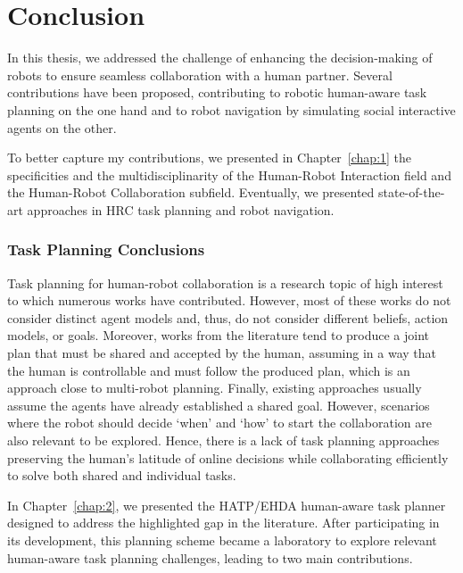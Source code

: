 \chapter*{Conclusion}


In this thesis, we addressed the challenge of enhancing the decision-making of robots to ensure seamless collaboration with a human partner. Several contributions have been proposed, contributing to robotic human-aware task planning on the one hand and to robot navigation by simulating social interactive agents on the other. 

To better capture my contributions, we presented in Chapter~\ref{chap:1} the specificities and the multidisciplinarity of the Human-Robot Interaction field and the Human-Robot Collaboration subfield. Eventually, we presented state-of-the-art approaches in HRC task planning and robot navigation. 

\subsection*{Task Planning Conclusions}

Task planning for human-robot collaboration is a research topic of high interest to which numerous works have contributed. However, most of these works do not consider distinct agent models and, thus, do not consider different beliefs, action models, or goals. Moreover, works from the literature tend to produce a joint plan that must be shared and accepted by the human, assuming in a way that the human is controllable and must follow the produced plan, which is an approach close to multi-robot planning. Finally, existing approaches usually assume the agents have already established a shared goal. However, scenarios where the robot should decide `when' and `how' to start the collaboration are also relevant to be explored. 
Hence, there is a lack of task planning approaches preserving the human's latitude of online decisions while collaborating efficiently to solve both shared and individual tasks. 


In Chapter~\ref{chap:2}, we presented the HATP/EHDA human-aware task planner designed to address the highlighted gap in the literature. After participating in its development, this planning scheme became a laboratory to explore relevant human-aware task planning challenges, leading to two main contributions. 

